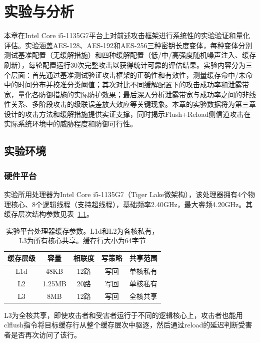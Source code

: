 \chapter{实验与分析}

本章在Intel Core i5-1135G7平台上对前述攻击框架进行系统性的实验验证和量化评估。实验涵盖AES-128、AES-192和AES-256三种密钥长度变体，每种变体分别测试基准配置（无缓解措施）和四种缓解配置（低/中/高强度随机噪声注入、缓存刷新），每轮配置运行30次完整攻击以获得统计可靠的评估结果。实验内容分为三个层面：首先通过基准测试验证攻击框架的正确性和有效性，测量缓存命中/未命中的时间分布并校准分类阈值；其次对比不同缓解配置下的攻击成功率和泄露带宽，量化各防御措施的实际防护效果；最后深入分析泄露带宽与成功率之间的非线性关系、多阶段攻击的级联误差放大效应等关键现象。本章的实验数据将为第三章设计的攻击方法和缓解措施提供实证支撑，同时揭示Flush+Reload侧信道攻击在实际系统环境中的威胁程度和防御可行性。

\section{实验环境}

\subsection{硬件平台}

实验所用处理器为Intel Core i5-1135G7（Tiger Lake微架构），该处理器拥有4个物理核心、8个逻辑线程（支持超线程），基础频率2.40GHz，最大睿频4.20GHz。其缓存层次结构参数见表~\ref{tab:cpu_cache}。

\begin{table}[htbp]
    \centering
    \caption{实验平台处理器缓存参数。L1d和L2为各核私有，L3为所有核心共享。缓存行大小为64字节}
    \label{tab:cpu_cache}
    \begin{tabular}{ccccc}
        \toprule
        缓存层级 & 容量 & 相联度 & 写策略 & 共享范围 \\
        \midrule
        L1d & 48KB & 12路 & 写回 & 单核私有 \\
        L2 & 1.25MB & 20路 & 写回 & 单核私有 \\
        L3 & 8MB & 12路 & 写回 & 全核共享 \\
        \bottomrule
    \end{tabular}
\end{table}

L3为全核共享，即使攻击者和受害者运行于不同的逻辑核心上，攻击者也能用clflush指令将目标缓存行从整个缓存层次中驱逐，然后通过reload的延迟判断受害者是否再次访问了该行。

